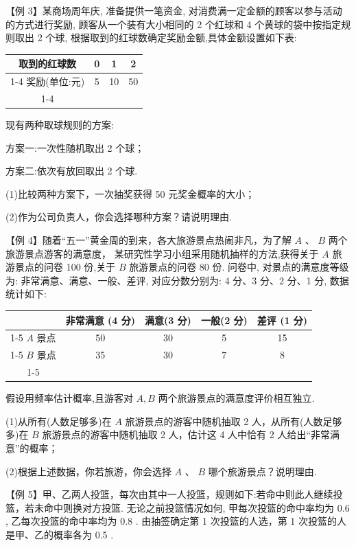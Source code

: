 【例 3】某商场周年庆, 准备提供一笔资金, 对消费满一定金额的顾客以参与活动的方式进行奖励, 顾客从一个装有大小相同的 2 个红球和 4 个黄球的袋中按指定规则取出 2 个球, 根据取到的红球数确定奖励金额,具体金额设置如下表:

\begin{center}
\begin{tabular}{|c|c|c|c|}
\hline
取到的红球数 & 0 & 1 & 2 \\
\cline{1-4}
奖励(单位:元) & 5 & 10 & 50 \\
\cline{1-4}
\hline
\end{tabular}
\end{center}

现有两种取球规则的方案:

方案一:一次性随机取出 2 个球；

方案二:依次有放回取出 2 个球.

(1)比较两种方案下，一次抽奖获得 50 元奖金概率的大小；

(2)作为公司负责人，你会选择哪种方案？请说明理由.

【例 4】随着“五一”黄金周的到来，各大旅游景点热闹非凡，为了解 $A$ 、 $B$ 两个旅游景点游客的满意度， 某研究性学习小组采用随机抽样的方法,获得关于 $A$ 旅游景点的问卷 100 份,关于 $B$ 旅游景点的问卷 80 份. 问卷中, 对景点的满意度等级为: 非常满意、满意、一般、差评, 对应分数分别为: 4 分、3 分、2 分、1 分, 数据统计如下:

\begin{center}
\begin{tabular}{|c|c|c|c|c|}
\hline
\phantom{X} & 非常满意 (4 分) & 满意(3 分) & 一般(2 分) & 差评 (1 分) \\
\cline{1-5}
$A$ 景点 & 50 & 30 & 5 & 15 \\
\cline{1-5}
$B$ 景点 & 35 & 30 & 7 & 8 \\
\cline{1-5}
\hline
\end{tabular}
\end{center}

假设用频率估计概率,且游客对 $A,B$ 两个旅游景点的满意度评价相互独立.

(1)从所有(人数足够多)在 $A$ 旅游景点的游客中随机抽取 2 人，从所有(人数足够多)在 $B$ 旅游景点的游客中随机抽取 2 人，估计这 4 人中恰有 2 人给出“非常满意”的概率；

(2)根据上述数据，你若旅游，你会选择 $A$ 、 $B$ 哪个旅游景点？说明理由.

【例 5】甲、乙两人投篮，每次由其中一人投篮，规则如下:若命中则此人继续投篮，若未命中则换对方投篮. 无论之前投篮情况如何, 甲每次投篮的命中率均为 0.6 , 乙每次投篮的命中率均为 0.8 . 由抽签确定第 1 次投篮的人选，第 1 次投篮的人是甲、乙的概率各为 0.5 .

